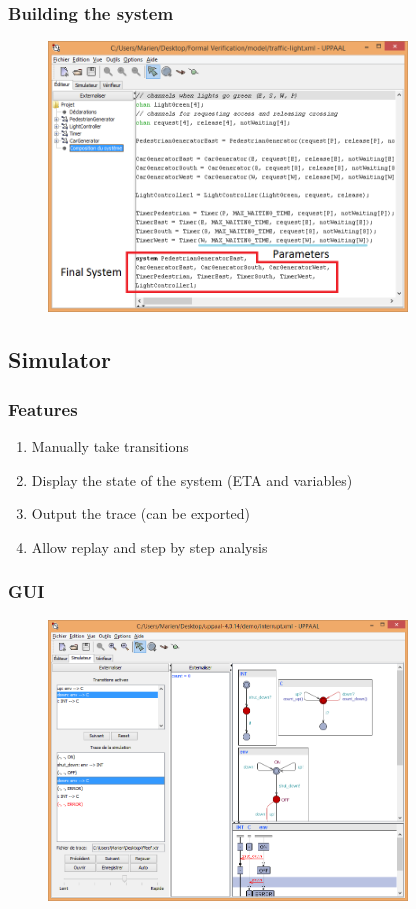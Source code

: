 \documentclass{bredelebeamer}
\begin{document}
\begin{frame}
	\frametitle{Building the system}
	\begin{figure}
    	\centering
    	\includegraphics[width = 0.85\textwidth]{uppaal_main_window_system.png}
  	\end{figure}
\end{frame}

\subsection{Simulator}
\begin{frame}
	\frametitle{Features}
	\begin{block}{}
		\begin{enumerate}
			\item Manually take transitions
			\item Display the state of the system (ETA and variables)
			\item Output the trace (can be exported)
			\item Allow replay and step by step analysis
		\end{enumerate}
	\end{block}
\end{frame}

\begin{frame}
	\frametitle{GUI}
	\begin{figure}
    	\centering
    	\includegraphics[width = 0.85\textwidth]{uppaal_simulator.png}
  	\end{figure}
\end{frame}
\end{document}
